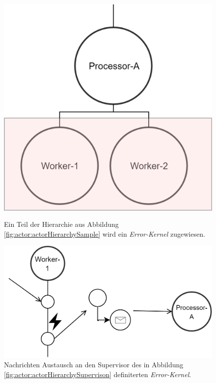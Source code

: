 \begin{figure}
  \centering
  \begin{minipage}{.4\textwidth}
    \centering
    \includegraphics[width=\linewidth]{gfx/actor/actorHierchyErrorKernel}
    \caption{Ein Teil der Hierarchie aus Abbildung \ref{fig:actor:actorHierarchySample} wird ein \textit{Error-Kernel} zugewiesen.}
    \label{fig:actor:actorHierarchySupervison}    
  \end{minipage}%
  \begin{minipage}{.1\textwidth}
  \end{minipage}%
  \begin{minipage}{.5\textwidth}
   \centering
   \includegraphics[width=\linewidth]{gfx/actor/actorSupervisionMessageExample}
   \caption{Nachrichten Austausch an den Supervisor des in Abbildung \ref{fig:actor:actorHierarchySupervison} definiterten \textit{Error-Kernel}.}
   \label{fig:actor:actorHierarchySupervisonMessaging}
  \end{minipage}
\end{figure} 

